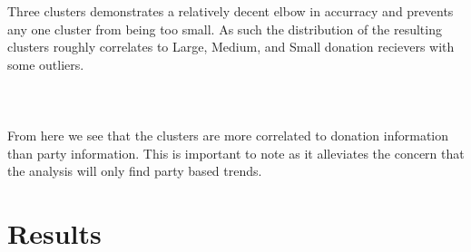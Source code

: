 \documentclass[journal]{IEEEtran}
\begin{document}
Three clusters demonstrates a relatively decent elbow in accurracy and prevents any one cluster from being too small. As such
the distribution of the resulting clusters roughly correlates to Large, Medium, and Small donation recievers with some outliers.\\\\
\\\\
From here we see that the clusters are more correlated to donation information than party information. This is important to note
as it alleviates the concern that the analysis will only find party based trends.
\section{Results}
\end{document}
